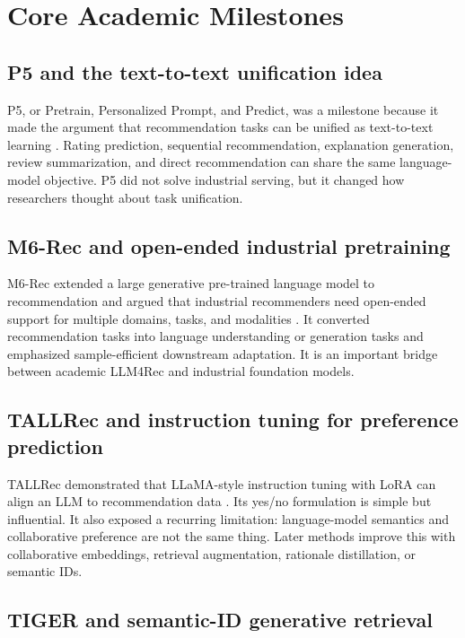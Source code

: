 \documentclass[11pt]{article}
\begin{document}
\section{Core Academic Milestones}

\subsection{P5 and the text-to-text unification idea}

P5, or Pretrain, Personalized Prompt, and Predict, was a milestone because it made the argument that recommendation tasks can be unified as text-to-text learning \cite{p5}. Rating prediction, sequential recommendation, explanation generation, review summarization, and direct recommendation can share the same language-model objective. P5 did not solve industrial serving, but it changed how researchers thought about task unification.

\subsection{M6-Rec and open-ended industrial pretraining}

M6-Rec extended a large generative pre-trained language model to recommendation and argued that industrial recommenders need open-ended support for multiple domains, tasks, and modalities \cite{m6rec}. It converted recommendation tasks into language understanding or generation tasks and emphasized sample-efficient downstream adaptation. It is an important bridge between academic LLM4Rec and industrial foundation models.

\subsection{TALLRec and instruction tuning for preference prediction}

TALLRec demonstrated that LLaMA-style instruction tuning with LoRA can align an LLM to recommendation data \cite{tallrec}. Its yes/no formulation is simple but influential. It also exposed a recurring limitation: language-model semantics and collaborative preference are not the same thing. Later methods improve this with collaborative embeddings, retrieval augmentation, rationale distillation, or semantic IDs.

\subsection{TIGER and semantic-ID generative retrieval}
\end{document}
